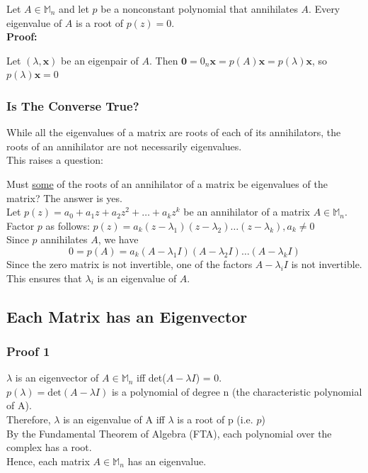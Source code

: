 \documentclass[12pt, letterpaper]{article}
\begin{document}
Let $A\in \mathbb{M}_n$ and let $p$ be a nonconstant polynomial that annihilates $A$. 
Every eigenvalue of $A$ is a root of $p(z)=0$. \\ 

\noindent \textbf{Proof:} 

Let $(\lambda,\mathbf{x})$ be an eigenpair of $A$. Then $\mathbf{0} = 0_n\mathbf{x}=p(A)\mathbf{x} = p(\lambda)\mathbf{x}$, so $p(\lambda)\mathbf{x} = 0$


\subsubsection{Is The Converse True?}
While all the eigenvalues of a matrix are roots of each of its annihilators,
the roots of an annihilator are not necessarily eigenvalues. \\

\noindent This raises a question:

Must \underline{some} of the roots of an annihilator of a matrix be eigenvalues
of the matrix? The answer is yes. \\

\noindent Let $p(z) = a_0 + a_1z + a_2z^2 + \ldots + a_kz^k$ be an annihilator of a matrix $A \in \mathbb{M}_n$. \\
Factor $p$ as follows: $p(z) = a_k(z-\lambda _1)(z-\lambda _2)\ldots(z-\lambda _k), a_k \ne 0$ \\
Since $p$ annihilates $A$, we have
\[
0=p(A)=a_k(A-\lambda_1I)(A-\lambda_2I)\ldots(A-\lambda_kI)
\]
Since the zero matrix is not invertible, one of the factors $A-\lambda_iI$ is not invertible. 
This ensures that $\lambda_i$ is an eigenvalue of $A$.

\subsection{Each Matrix has an Eigenvector}
\subsubsection{Proof 1}
$\lambda$ is an eigenvector of $A \in \mathbb{M}_n$ iff det($A-\lambda I$) = 0. \\
$p(\lambda) = \text{det} (A-\lambda I)$ is a polynomial of degree n (the characteristic polynomial of A). \\
Therefore, $\lambda$ is an eigenvalue of A iff $\lambda$ is a root of p (i.e. $p$) \\
By the Fundamental Theorem of Algebra (FTA), each polynomial over the complex has a root. \\
Hence, each matrix $A \in \mathbb{M}_n$ has an eigenvalue.
\end{document}
